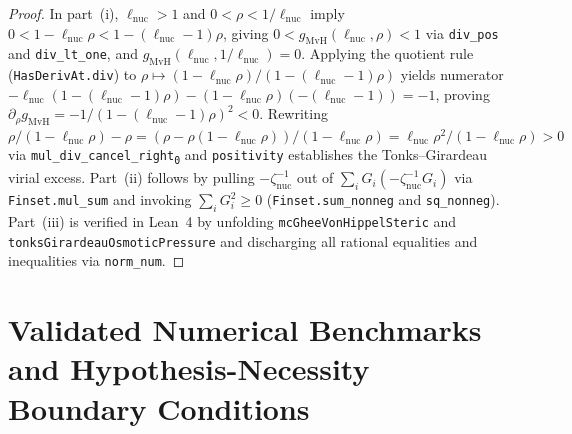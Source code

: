 \documentclass[11pt,a4paper]{article}
\theoremstyle{definition}
\begin{document}
\begin{proof}
In part~(i), $\ell_{\mathrm{nuc}} > 1$ and $0 < \rho < 1/\ell_{\mathrm{nuc}}$ imply $0 < 1 - \ell_{\mathrm{nuc}}\rho < 1 - (\ell_{\mathrm{nuc}}-1)\rho$, giving $0 < g_{\mathrm{MvH}}(\ell_{\mathrm{nuc}}, \rho) < 1$ via \texttt{div\_pos} and \texttt{div\_lt\_one}, and $g_{\mathrm{MvH}}(\ell_{\mathrm{nuc}}, 1/\ell_{\mathrm{nuc}}) = 0$. Applying the quotient rule (\texttt{HasDerivAt.div}) to $\rho \mapsto (1 - \ell_{\mathrm{nuc}}\rho)/(1 - (\ell_{\mathrm{nuc}}-1)\rho)$ yields numerator $-\ell_{\mathrm{nuc}}(1 - (\ell_{\mathrm{nuc}}-1)\rho) - (1 - \ell_{\mathrm{nuc}}\rho)(-(\ell_{\mathrm{nuc}}-1)) = -1$, proving $\partial_\rho g_{\mathrm{MvH}} = -1/(1-(\ell_{\mathrm{nuc}}-1)\rho)^2 < 0$. Rewriting $\rho/(1-\ell_{\mathrm{nuc}}\rho) - \rho = (\rho - \rho(1-\ell_{\mathrm{nuc}}\rho))/(1-\ell_{\mathrm{nuc}}\rho) = \ell_{\mathrm{nuc}}\rho^2/(1-\ell_{\mathrm{nuc}}\rho) > 0$ via \texttt{mul\_div\_cancel\_right\textsubscript{0}} and \texttt{positivity} establishes the Tonks--Girardeau virial excess. Part~(ii) follows by pulling $-\zeta_{\mathrm{nuc}}^{-1}$ out of $\sum_i G_i(-\zeta_{\mathrm{nuc}}^{-1}G_i)$ via \texttt{Finset.mul\_sum} and invoking $\sum_i G_i^2 \ge 0$ (\texttt{Finset.sum\_nonneg} and \texttt{sq\_nonneg}). Part~(iii) is verified in Lean~4 by unfolding \texttt{mcGheeVonHippelSteric} and \texttt{tonksGirardeauOsmoticPressure} and discharging all rational equalities and inequalities via \texttt{norm\_num}.
\end{proof}

\section{Validated Numerical Benchmarks and Hypothesis-Necessity Boundary Conditions}
\end{document}
